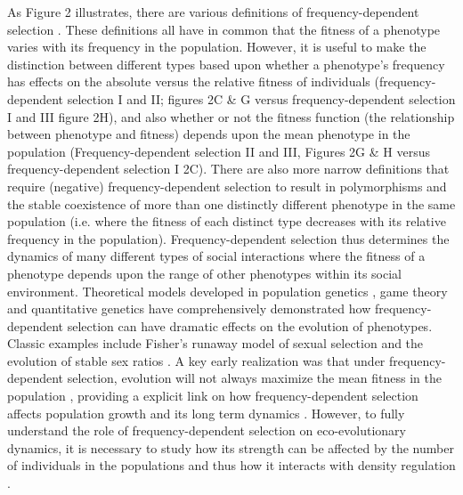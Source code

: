 \documentclass{article}
\begin{document}
 As Figure 2 illustrates, there are various definitions of frequency-dependent selection \citep{Heino1998}. These definitions all have in common that the fitness of a phenotype varies with its frequency in the population. However, it is useful to make the distinction between different types based upon whether a phenotype's frequency has effects on the absolute versus the relative fitness of individuals (frequency-dependent selection I and II; figures 2C \& G versus frequency-dependent selection I and III figure 2H), and also whether or not the fitness function (the relationship between phenotype and fitness) depends upon the mean phenotype in the population (Frequency-dependent selection II and III, Figures 2G \& H versus frequency-dependent selection I 2C). There are also more narrow definitions that require (negative) frequency-dependent selection to result in polymorphisms and the stable coexistence of more than one distinctly different phenotype in the same population (i.e. where the fitness of each distinct type decreases with its relative frequency in the population). Frequency-dependent selection thus determines the dynamics of many different types of social interactions where the fitness of a phenotype depends upon the range of other phenotypes within its social environment. Theoretical models developed in population genetics \citep{Wright1969}, game theory \citep{McNamaraLeimar2020} and quantitative genetics \citep{Lande2007, Engen2020} have comprehensively demonstrated how frequency-dependent selection can have dramatic effects on the evolution of phenotypes. Classic examples include Fisher's runaway model of sexual selection and the evolution of stable sex ratios \citep{Fisher1930}. A key early realization was that under frequency-dependent selection, evolution will not always maximize the mean fitness in the population \citep{Wright1969}, providing a explicit link on how frequency-dependent selection affects population growth and its long term dynamics \citep{Svensson2018}. However, to fully understand the role of frequency-dependent selection on eco-evolutionary dynamics, it is necessary to study how its strength can be affected by the number of individuals in the populations and thus how it interacts with density regulation \citep{Anderson1971, Matessi1976, Asmussen1983, Heino1998, Joshi2001, Engen2020}. 
 
\end{document}

